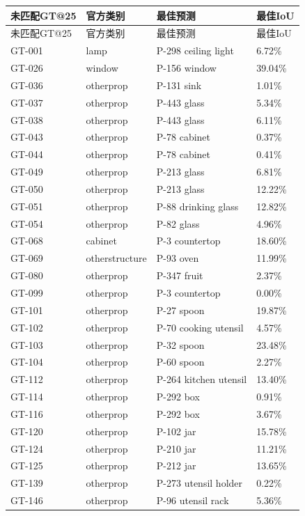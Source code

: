 \documentclass[UTF8,fontset=fandol]{ctexart}
\begin{document}
{\small
\begin{longtable}{|p{}|p{}|p{}|p{}|}
\hline
未匹配GT@25 & 官方类别 & 最佳预测 & 最佳IoU \\ \hline
\endfirsthead
\hline
未匹配GT@25 & 官方类别 & 最佳预测 & 最佳IoU \\ \hline
\endhead
GT-001 & lamp & P-298 ceiling light & 6.72\% \\ \hline
GT-026 & window & P-156 window & 39.04\% \\ \hline
GT-036 & otherprop & P-131 sink & 1.01\% \\ \hline
GT-037 & otherprop & P-443 glass & 5.34\% \\ \hline
GT-038 & otherprop & P-443 glass & 6.11\% \\ \hline
GT-043 & otherprop & P-78 cabinet & 0.37\% \\ \hline
GT-044 & otherprop & P-78 cabinet & 0.41\% \\ \hline
GT-049 & otherprop & P-213 glass & 6.81\% \\ \hline
GT-050 & otherprop & P-213 glass & 12.22\% \\ \hline
GT-051 & otherprop & P-88 drinking glass & 12.82\% \\ \hline
GT-054 & otherprop & P-82 glass & 4.96\% \\ \hline
GT-068 & cabinet & P-3 countertop & 18.60\% \\ \hline
GT-069 & otherstructure & P-93 oven & 11.99\% \\ \hline
GT-080 & otherprop & P-347 fruit & 2.37\% \\ \hline
GT-099 & otherprop & P-3 countertop & 0.00\% \\ \hline
GT-101 & otherprop & P-27 spoon & 19.87\% \\ \hline
GT-102 & otherprop & P-70 cooking utensil & 4.57\% \\ \hline
GT-103 & otherprop & P-32 spoon & 23.48\% \\ \hline
GT-104 & otherprop & P-60 spoon & 2.27\% \\ \hline
GT-112 & otherprop & P-264 kitchen utensil & 13.40\% \\ \hline
GT-114 & otherprop & P-292 box & 0.91\% \\ \hline
GT-116 & otherprop & P-292 box & 3.67\% \\ \hline
GT-120 & otherprop & P-102 jar & 15.78\% \\ \hline
GT-124 & otherprop & P-210 jar & 11.21\% \\ \hline
GT-125 & otherprop & P-212 jar & 13.65\% \\ \hline
GT-139 & otherprop & P-273 utensil holder & 0.22\% \\ \hline
GT-146 & otherprop & P-96 utensil rack & 5.36\% \\ \hline
\end{longtable}
}
\end{document}
